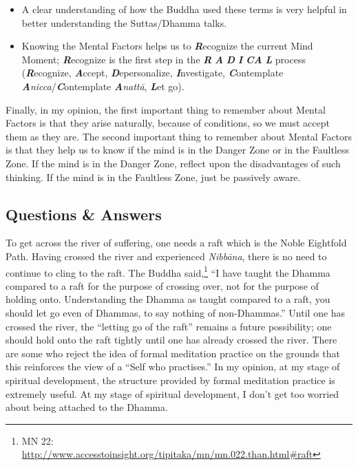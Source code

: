 \begin{itemize}
\begin{itemize}
\end{itemize}

\item A clear understanding of how the Buddha used these terms is very helpful in better understanding the Suttas/Dhamma talks.

\item Knowing the Mental Factors helps us to \textbf{\textit{R}}ecognize the current Mind Moment; \textbf{\textit{R}}ecognize is the first step in the \textbf{\textit{R}} \textbf{\textit{A}} \textbf{\textit{D}} \textbf{\textit{I}} \textbf{\textit{CA}} \textbf{\textit{L}} process (\textbf{\textit{R}}ecognize, \textbf{\textit{A}}ccept, \textbf{\textit{D}}epersonalize, \textbf{\textit{I}}nvestigate, \textbf{\textit{C}}ontemplate \textbf{\textit{A}}\textit{nicca}/\textbf{\textit{C}}ontemplate \textbf{\textit{A}}\textit{nattā}, \textbf{\textit{L}}et go).

\end{itemize}

Finally, in my opinion, the first important thing to remember about Mental Factors is that they arise naturally, because of conditions, so we must accept them as they are. The second important thing to remember about Mental Factors is that they help us to know if the mind is in the Danger Zone or in the Faultless Zone. If the mind is in the Danger Zone, reflect upon the disadvantages of such thinking. If the mind is in the Faultless Zone, just be passively aware.

\newpage

\subsection*{Questions \& Answers}


To get across the river of suffering, one needs a raft which is the Noble Eightfold Path. Having crossed the river and experienced \textit{Nibbāna}, there is no need to continue to cling to the raft. The Buddha said,\footnote{MN 22: \url{http://www.accesstoinsight.org/tipitaka/mn/mn.022.than.html\#raft}} “I have taught the Dhamma compared to a raft for the purpose of crossing over, not for the purpose of holding onto. Understanding the Dhamma as taught compared to a raft, you should let go even of Dhammas, to say nothing of non-Dhammas.” Until one has crossed the river, the “letting go of the raft” remains a future possibility; one should hold onto the raft tightly until one has already crossed the river. There are some who reject the idea of formal meditation practice on the grounds that this reinforces the view of a “Self who practises.” In my opinion, at my stage of spiritual development, the structure provided by formal meditation practice is extremely useful. At my stage of spiritual development, I don’t get too worried about being attached to the Dhamma.

